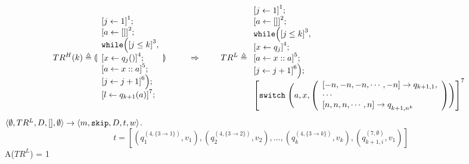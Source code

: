 \documentclass[a4paper,11pt]{article}
\begin{document}
%
%
\begin{example}
\[
TR^H(k) \triangleq
\ts{
\begin{array}{l}
    \left[j \leftarrow 1 \right]^1 ; \\
    \left[a \leftarrow [] \right]^2; \\
    \ewhile \Big( 
    \left[j \leq k \right]^3 , \\
     \left[x \leftarrow q_j() \right]^4 ; \\
    \left[a \leftarrow x :: a \right]^5;\\
    \left[j \leftarrow j + 1 \right]^6
    \Big);\\
    \clabel{l \leftarrow q_{k + 1}(a)}^7;\\
\end{array}
}
%
~~~~~~~~ \Rightarrow ~~~~~~~
%
TR^L \triangleq
\begin{array}{l}
    \left[j \leftarrow 1 \right]^1 ; \\
    \left[a \leftarrow [] \right]^2; \\
    \ewhile \Big( 
    \left[j \leq k \right]^3, \\
     \left[x \leftarrow q_j \right]^4; \\
    \left[a \leftarrow x :: a \right]^5;\\
    \left[j \leftarrow j + 1 \right]^6
    \Big);\\
    \clabel{
\eswitch \Bigg(a, x, 
    \left(\begin{array}{l}
    \left[-n, -n, -n, \cdots, -n\right] \to q_{k + 1,1},\\
    \cdots\\
    \left[n, n, n, \cdots, n\right] \to q^{}_{k + 1, n^k}
\end{array} \right) \Bigg)
    }^7
\end{array}
\]
$\langle \emptyset, TR^L, D, [],\emptyset \rangle \rightarrow \langle m, \mathtt{skip}, D, t, w  \rangle $.
$$t = [ (q_1^{(4, \{3 \to 1\} )},v_1 ), (q_2^{(4, \{3 \to 2\} )},v_2 ), \ldots, (q_k^{(4, \{3 \to k\} )},v_k ) , (q_{k+1, i }^{(7, \emptyset )},v_1 )  ] $$
%
A($TR^L$) = 1


\end{example}
\end{document}
